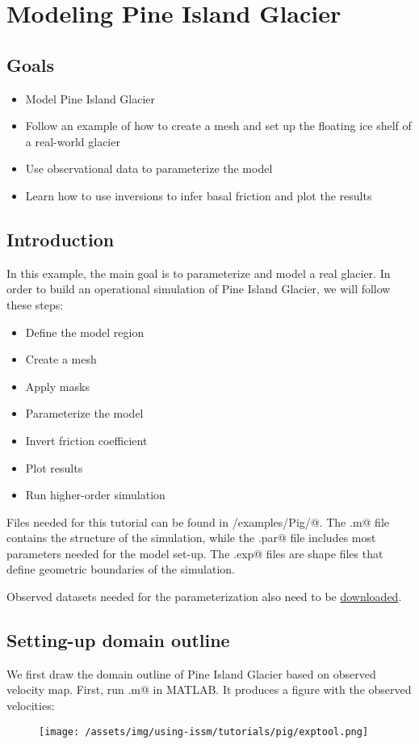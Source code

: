 \section{Modeling Pine Island Glacier}
\subsection{Goals} %
\begin{itemize}
	\item Model Pine Island Glacier
	\item Follow an example of how to create a mesh and set up the floating ice shelf of a real-world glacier
	\item Use observational data to parameterize the model
	\item Learn how to use inversions to infer basal friction and plot the results
\end{itemize}
\subsection{Introduction}%
In this example, the main goal is to parameterize and model a real glacier. In order to build an operational simulation of Pine Island Glacier, we will follow these steps:
\begin{itemize}
	\item Define the model region
	\item Create a mesh
	\item Apply masks
	\item Parameterize the model
	\item Invert friction coefficient
	\item Plot results
	\item Run higher-order simulation
\end{itemize}

Files needed for this tutorial can be found in \verb@trunk/examples/Pig/@. The \verb@runme.m@ file contains the structure of the simulation, while the \verb@.par@ file includes most parameters needed for the model set-up. The \verb@.exp@ files are shape files that define geometric boundaries of the simulation.

Observed datasets needed for the parameterization also need to be \href{https://issm.jpl.nasa.gov/documentation/tutorials/datasets/}{downloaded}.
\subsection{Setting-up domain outline} %
We first draw the domain outline of Pine Island Glacier based on observed velocity map. First, run \verb@PigRegion.m@ in MATLAB. It produces a figure with the observed velocities:
\begin{figure}[H]
	\begin{center}
		\texttt{[image: /assets/img/using-issm/tutorials/pig/exptool.png]}
	\end{center}
\end{figure}

